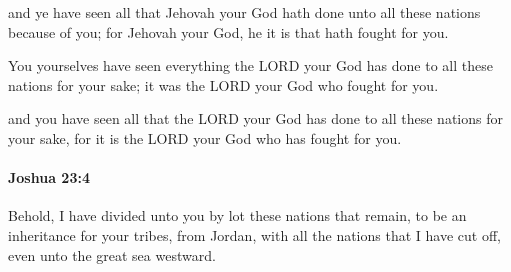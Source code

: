 			\begin{versebox}
					\item[BHS] 
					\item[ASV] and ye have seen all that Jehovah your God hath done unto all these nations because of you; for Jehovah your God, he it is that hath fought for you.
					\item[NIV] You yourselves have seen everything the LORD your God has done to all these nations for your sake; it was the LORD your God who fought for you.
					\item[NRSV] and you have seen all that the LORD your God has done to all these nations for your sake, for it is the LORD your God who has fought for you.
			\end{versebox}

		\paragraph{Joshua 23:4} %
			\label{JOSHUA-23-4}

			Behold, I have divided unto you by lot these nations that remain, to be an inheritance for your tribes, from Jordan, with all the nations that I have cut off, even unto the great sea westward.

